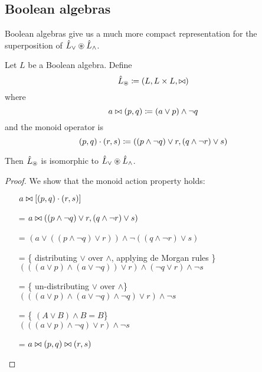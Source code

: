 \subsection{Boolean algebras}

Boolean algebras give us a much more compact representation for the
superposition of $\hat{L}_\vee \circledast \hat{L}_\wedge$.

\begin{prop}
  Let $L$ be a Boolean algebra. Define
  $$\hat{L}_\circledast \coloneqq (L,L \times L,\bowtie)$$
  where
  $$a \bowtie (p, q) \coloneqq (a \vee p) \wedge \neg q$$
  and the monoid operator is
  $$(p, q) \cdot (r, s) \coloneqq ((p \wedge \neg q) \vee r, (q \wedge \neg r) \vee s)$$

  Then $\hat{L}_\circledast$ is isomorphic to $\hat{L}_\vee \circledast \hat{L}_\wedge$.
\end{prop}
\ifproofs
\begin{proof}
  We show that the monoid action property holds:
  \begin{itemize}
    \item[ ]$a \bowtie \left[(p, q) \cdot (r, s)\right]$
    \item[=]$a \bowtie ((p \wedge \neg q) \vee r, (q \wedge \neg r) \vee s)$
    \item[=]$
      \left(
        a \vee
        \left(
          \left(
            p \wedge \neg q
          \right)
          \vee r
        \right)
      \right)
      \wedge \neg
      \left(
        \left(
          q \wedge \neg r
        \right)
        \vee s
      \right)$
    \item[=]\{ distributing $\vee$ over $\wedge$, applying de Morgan rules \}\\
      $
      \left(
        \left(
          \left(  
            a \vee p
          \right)
          \wedge
          \left(
            a \vee \neg q
          \right)
        \right)
        \vee r
      \right)
      \wedge 
      \left(
        \neg q \vee r
      \right)
      \wedge
      \neg s
      $
    \item[=]\{ un-distributing $\vee$ over $\wedge $\}\\
      $
      \left(
        \left(
          \left(  
            a \vee p
          \right)
          \wedge
          \left(
            a \vee \neg q
          \right)
          \wedge
          \neg q
        \right)
        \vee r
      \right)
      \wedge
      \neg s
      $
    \item[=]\{ $(A \vee B) \wedge B = B$\}\\
      $
      \left(
        \left(
          \left(  
            a \vee p
          \right)
          \wedge
          \neg q
        \right)
        \vee r
      \right)
      \wedge
      \neg s
      $
    \item[=]$a \bowtie (p, q) \bowtie (r, s)$
  \end{itemize}
\end{proof}
\fi

